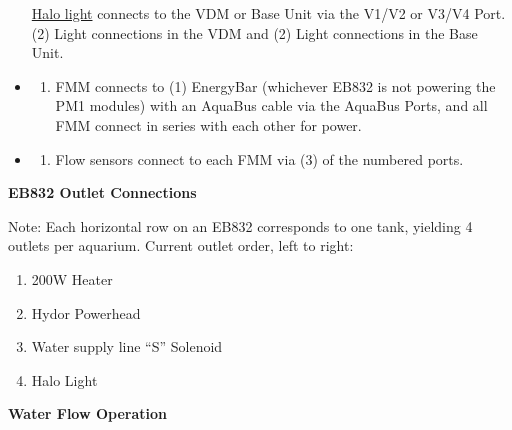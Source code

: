 \documentclass[]{book}
\providecommand{\tightlist}{%
  \setlength{\itemsep}{0pt}\setlength{\parskip}{0pt}}
\begin{document}
\begin{itemize}
  \href{https://github.com/SilbigerLab/Mesocosm_User_Manual/tree/394a3f7d9fed8765e4152f9fdd11d00a2ea87a93/Manuals/HALO_Quick_Start_Guide.pdf}{Halo
  light} connects to the VDM or Base Unit via the V1/V2 or V3/V4 Port.
  (2) Light connections in the VDM and (2) Light connections in the Base
  Unit.\\
\item
  \begin{enumerate}
  \def\labelenumi{(\arabic{enumi})}
  \tightlist
  \item
    FMM connects to (1) EnergyBar (whichever EB832 is not powering the
    PM1 modules) with an AquaBus cable via the AquaBus Ports, and all
    FMM connect in series with each other for power.\\
  \end{enumerate}
\item
  \begin{enumerate}
  \def\labelenumi{(\arabic{enumi})}
  \setcounter{enumi}{2}
  \tightlist
  \item
    Flow sensors connect to each FMM via (3) of the numbered ports.
  \end{enumerate}
\end{itemize}

 \textbf{EB832 Outlet Connections}

Note: Each horizontal row on an EB832 corresponds to one tank, yielding
4 outlets per aquarium. Current outlet order, left to right:

\begin{enumerate}
\def\labelenumi{\arabic{enumi}.}
\tightlist
\item
  200W Heater
\item
  Hydor Powerhead
\item
  Water supply line ``S'' Solenoid
\item
  Halo Light
\end{enumerate}

 \textbf{Water Flow Operation}
\end{document}
